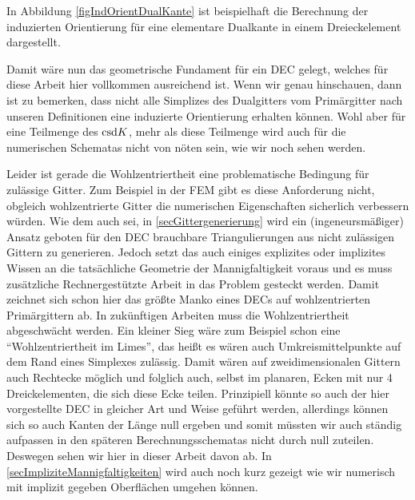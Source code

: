     In Abbildung \ref{figIndOrientDualKante} ist beispielhaft die Berechnung der induzierten Orientierung für eine elementare Dualkante in einem Dreieckelement dargestellt. 

  \begin{fazit}
    Damit wäre nun das geometrische Fundament für ein DEC gelegt, welches für diese Arbeit hier vollkommen ausreichend ist.
    Wenn wir genau hinschauen, dann ist zu bemerken, dass nicht alle Simplizes des Dualgitters vom Primärgitter nach unseren Definitionen eine induzierte Orientierung erhalten können.
    Wohl aber für eine Teilmenge des \( \text{csd} K \), mehr als diese Teilmenge wird auch für die
    numerischen Schematas nicht von nöten sein, wie wir noch sehen werden.
    
    Leider ist gerade die Wohlzentriertheit eine problematische Bedingung für zulässige Gitter.
    Zum Beispiel in der FEM gibt es diese Anforderung nicht, obgleich wohlzentrierte Gitter die numerischen Eigenschaften sicherlich verbessern würden.
    Wie dem auch sei, in \ref{secGittergenerierung} wird ein (ingeneursmäßiger) Ansatz geboten für den DEC brauchbare Triangulierungen aus nicht zulässigen Gittern zu generieren.
    Jedoch setzt das auch einiges explizites oder implizites Wissen an die tatsächliche Geometrie der Mannigfaltigkeit voraus und es muss zusätzliche Rechnergestützte Arbeit in das Problem
    gesteckt werden. Damit zeichnet sich schon hier das größte Manko eines DECs auf wohlzentrierten Primärgittern ab.
    In zukünftigen Arbeiten muss die Wohlzentriertheit abgeschwächt werden.
    Ein kleiner Sieg wäre zum Beispiel schon eine "`Wohlzentriertheit im Limes"', das heißt es wären auch Umkreismittelpunkte auf dem Rand eines Simplexes zulässig.
    Damit wären auf zweidimensionalen Gittern auch Rechtecke möglich und folglich auch, selbst im planaren, Ecken mit nur 4 Dreickelementen, die sich diese Ecke teilen.
    Prinzipiell könnte so auch der hier vorgestellte DEC in gleicher Art und Weise geführt werden, allerdings können sich so auch Kanten der Länge null ergeben und somit müssten wir auch
    ständig aufpassen in den späteren Berechnungsschematas nicht durch null zuteilen. Deswegen sehen wir hier in dieser Arbeit davon ab.
    In \ref{secImpliziteMannigfaltigkeiten} wird auch noch kurz gezeigt wie wir numerisch mit implizit gegeben Oberflächen umgehen können.


\end{fazit}
